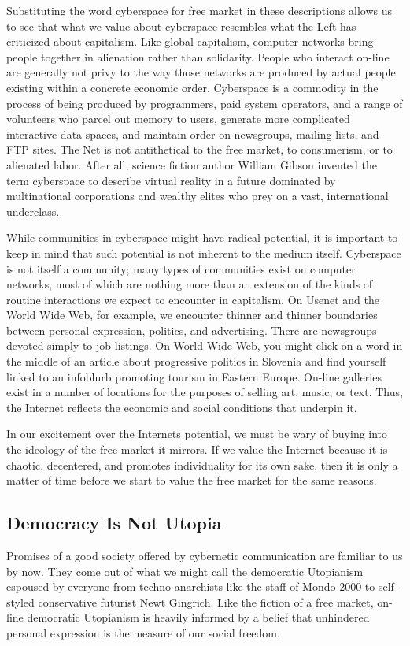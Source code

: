 \documentclass[letterpaper,12pt,english]{sphinxmanual}
\begin{document}
Substituting the word cyberspace for free market in these descriptions allows us to see that what we value about cyberspace resembles what the Left has criticized about capitalism. Like global capitalism, computer networks bring people together in alienation rather than solidarity. People who interact on-line are generally not privy to the way those networks are produced by actual people existing within a concrete economic order. Cyberspace is a commodity in the process of being produced by programmers, paid system operators, and a range of volunteers who parcel out memory to users, generate more complicated interactive data spaces, and maintain order on newsgroups, mailing lists, and FTP sites. The Net is not antithetical to the free market, to consumerism, or to alienated labor. After all, science fiction author William Gibson invented the term cyberspace to describe virtual reality in a future dominated by multinational corporations and wealthy elites who prey on a vast, international underclass.

While communities in cyberspace might have radical potential, it is important to keep in mind that such potential is not inherent to the medium itself. Cyberspace is not itself a community; many types of communities exist on computer networks, most of which are nothing more than an extension of the kinds of routine interactions we expect to encounter in capitalism. On Usenet and the World Wide Web, for example, we encounter thinner and thinner boundaries between personal expression, politics, and advertising. There are newsgroups devoted simply to job listings. On World Wide Web, you might click on a word in the middle of an article about progressive politics in Slovenia and find yourself linked to an infoblurb promoting tourism in Eastern Europe. On-line galleries exist in a number of locations for the purposes of selling art, music, or text. Thus, the Internet reflects the economic and social conditions that underpin it.

In our excitement over the Internets potential, we must be wary of buying into the ideology of the free market it mirrors. If we value the Internet because it is chaotic, decentered, and promotes individuality for its own sake, then it is only a matter of time before we start to value the free market for the same reasons.


\subsection{Democracy Is Not Utopia}
\label{1995:democracy-is-not-utopia}
Promises of a good society offered by cybernetic communication are familiar to us by now. They come out of what we might call the democratic Utopianism espoused by everyone from techno-anarchists like the staff of Mondo 2000 to self-styled conservative futurist Newt Gingrich. Like the fiction of a free market, on-line democratic Utopianism is heavily informed by a belief that unhindered personal expression is the measure of our social freedom.
\end{document}
